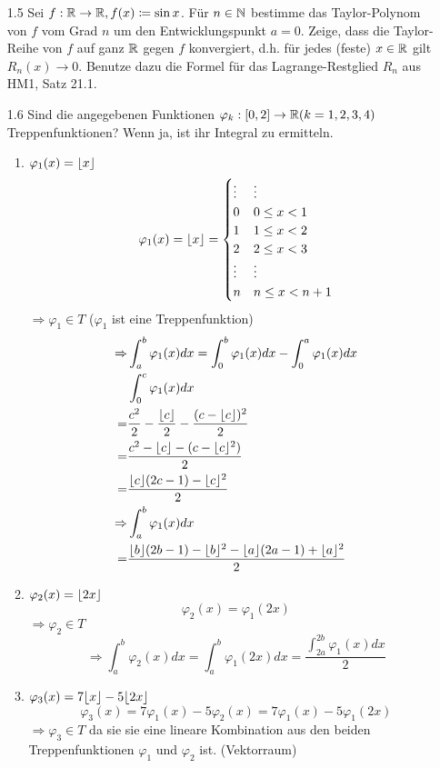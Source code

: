 \documentclass{HM}
\begin{document}
	\begin{enumerate}
		\item[1.5] Sei $f:\mathbb{R}\to\mathbb{R}, f(x)\coloneqq\sin x$. Für $n\in\mathbb{N}$ bestimme das Taylor-Polynom von $f$ vom Grad $n$ um den Entwicklungspunkt $a=0$. Zeige, dass die Taylor-Reihe von $f$ auf ganz $\mathbb{R}$ gegen $f$ konvergiert, d.h. für jedes (feste) $x\in\mathbb{R}$ gilt $R_n(x)\to 0$. Benutze dazu die Formel für das Lagrange-Restglied $R_n$ aus HM1, Satz 21.1.
		
		\item[1.6] Sind die angegebenen Funktionen $\varphi_k:[0,2]\to\mathbb{R}(k=1,2,3,4)$ Treppenfunktionen? Wenn ja, ist ihr Integral zu ermitteln.
		\begin{enumerate}
			\item $\varphi_1(x)=\lfloor x\rfloor$
				$$\varphi_1(x)=\lfloor x\rfloor=\begin{cases}
					\vdots& \vdots\\
					0&0\leq x < 1\\
					1&1\leq x < 2\\
					2&2\leq x < 3\\
					\vdots& \vdots\\
					n&n\leq x < n+1				
				\end{cases}$$
				$\Rightarrow \varphi_1\in T$ ($\varphi_1$ ist eine Treppenfunktion)\\
				\begin{align*}
					\Rightarrow &\int_a^b\varphi_1(x)dx = \int_0^b\varphi_1(x)dx-\int_0^a\varphi_1(x)dx\\
					&\int_0^c\varphi_1(x)dx\\
					=&\frac{c^2}{2}-\frac{\lfloor c\rfloor}{2}-\frac{(c-\lfloor c\rfloor)^2}{2}\\
					=&\frac{c^2-\lfloor c\rfloor-(c-\lfloor c\rfloor^2)}{2}\\
					=&\frac{\lfloor c\rfloor(2c-1)-\lfloor c\rfloor^2}{2}\\
					\Rightarrow &\int_a^b\varphi_1(x)dx\\
					=&\frac{\lfloor b\rfloor(2b-1)-\lfloor b\rfloor^2-\lfloor a\rfloor(2a-1)+\lfloor a\rfloor^2}{2}
				\end{align*}
			\item $\varphi_2(x)=\lfloor2x\rfloor$
				$$\varphi_2(x)=\varphi_1(2x)$$
				$\Rightarrow \varphi_2\in T$
				$$\Rightarrow \int_a^b\varphi_2(x)dx=\int_a^b\varphi_1(2x)dx=\frac{\int_{2a}^{2b}\varphi_1(x)dx}{2}$$
			\item $\varphi_3(x)=7\lfloor x\rfloor-5\lfloor2x\rfloor$
				$$\varphi_3(x)=7\varphi_1(x)-5\varphi_2(x)=7\varphi_1(x)-5\varphi_1(2x)$$
				$\Rightarrow \varphi_3\in T$ da sie sie eine lineare Kombination aus den beiden Treppenfunktionen $\varphi_1$ und $\varphi_2$ ist. (Vektorraum)

\end{enumerate}
\end{enumerate}
\end{document}
